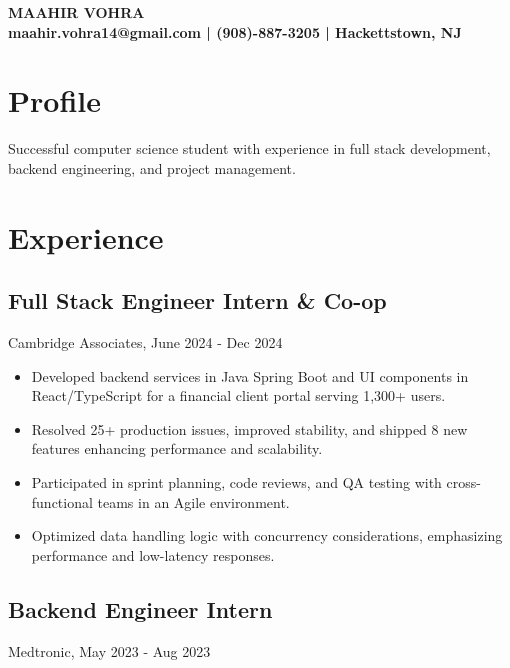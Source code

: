 \documentclass{article}
\begin{document}
\pagestyle{empty}

\begin{center}
{\Huge\bfseries\sffamily MAAHIR VOHRA}\\
\medskip
{\large\bfseries\sffamily maahir.vohra14@gmail.com | (908)-887-3205 | Hackettstown, NJ}
\end{center}

\section{Profile}
Successful computer science student with experience in full stack development, backend engineering, and project management.

\section{Experience}

\subsection{Full Stack Engineer Intern \& Co-op}
Cambridge Associates, June 2024 - Dec 2024

\begin{itemize}[leftmargin=*, itemsep=0.5em]
\item Developed backend services in Java Spring Boot and UI components in React/TypeScript for a financial client portal serving 1,300+ users.
\item Resolved 25+ production issues, improved stability, and shipped 8 new features enhancing performance and scalability.
\item Participated in sprint planning, code reviews, and QA testing with cross-functional teams in an Agile environment.
\item Optimized data handling logic with concurrency considerations, emphasizing performance and low-latency responses.
\end{itemize}

\subsection{Backend Engineer Intern}
Medtronic, May 2023 - Aug 2023
\end{document}
